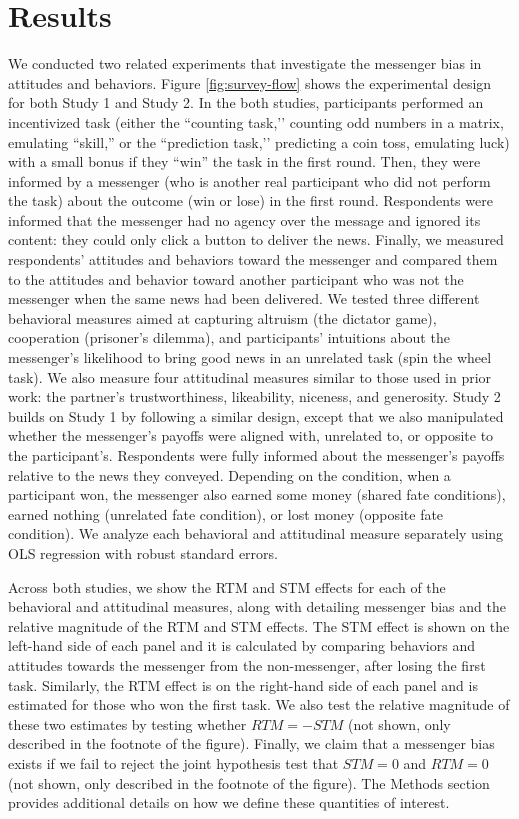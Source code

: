 \section{Results}



We conducted two related experiments that investigate the messenger bias
in attitudes and behaviors. Figure \ref{fig:survey-flow} shows the experimental design for
both Study 1 and Study 2. In the both studies, participants performed an
incentivized task (either the ``counting task,’’ counting odd numbers in a matrix, emulating ``skill,'' or the ``prediction task,’’ predicting a coin toss, emulating luck) with a
small bonus if they ``win'' the task in the first round. Then, they
were informed by a messenger (who is another real participant who did
not perform the task) about the outcome (win or lose) in the first
round. Respondents were informed that the messenger had no agency over the
message and ignored its content: they could only click a button to
deliver the news. Finally, we measured respondents' attitudes and
behaviors toward the messenger and compared them to the attitudes and
behavior toward another participant who was not the messenger when the
same news had been delivered. We tested three different behavioral
measures aimed at capturing altruism (the dictator game), cooperation
(prisoner's dilemma), and participants' intuitions about the messenger's
likelihood to bring good news in an unrelated task (spin the wheel
task). We also measure four attitudinal measures similar to those used
in prior work: the partner's trustworthiness, likeability, niceness, and
generosity. Study 2 builds on Study 1 by following a similar design,
except that we also manipulated whether the messenger's payoffs were
aligned with, unrelated to, or opposite to the participant's. Respondents
were fully informed about the messenger's payoffs relative to the news
they conveyed. Depending on the condition, when a participant won, the
messenger also earned some money (shared fate conditions), earned
nothing (unrelated fate condition), or lost money (opposite fate
condition). We analyze each behavioral and attitudinal measure
separately using OLS regression with robust standard errors.

Across both studies, we show the RTM and STM effects for each of the behavioral and attitudinal
measures, along with detailing messenger bias and the relative magnitude
of the RTM and STM effects. The STM effect is shown on the left-hand side of each panel and it is calculated by comparing behaviors and attitudes towards the messenger from the non-messenger, after losing the first task. 
Similarly, the RTM effect is on the right-hand side of each panel and is estimated for those who won the first task.
We also test the relative magnitude of these two estimates by testing
whether $RTM = -STM$ (not shown, only described in the footnote of
the figure). Finally, we claim that a messenger bias exists if we fail to
reject the joint hypothesis test that $STM = 0$ and $RTM = 0$ (not
shown, only described in the footnote of the figure). The Methods section
provides additional details on how we define these quantities of
interest.


